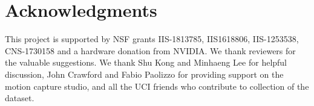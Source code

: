 \documentclass[times,referee,twocolumn,final,authoryear]{elsarticle}
\begin{document}
\section{Acknowledgments}
This project is supported by NSF grants IIS-1813785, IIS1618806, IIS-1253538,
CNS-1730158 and a hardware donation from NVIDIA. We thank reviewers for the 
valuable suggestions. We thank Shu
Kong and Minhaeng Lee for helpful discussion, John Crawford and Fabio Paolizzo
for providing support on the motion capture studio, and all the UCI friends who
contribute to collection of the dataset.











\end{document}
